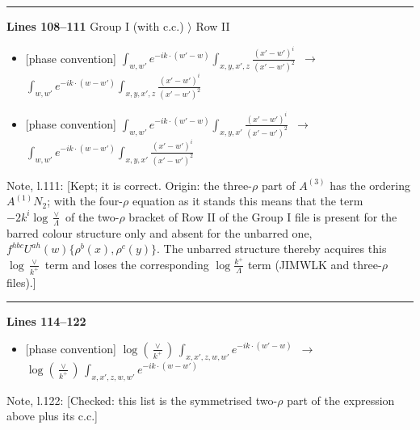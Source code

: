 \documentclass[10pt]{article}
\newenvironment{notebox}{\def\FrameCommand{{\color{notebar}\vrule width 1.5pt}\hspace{6pt}}\MakeFramed{\advance\hsize-\width\FrameRestore}\small}{\endMakeFramed}
\begin{document}
\noindent\rule{\linewidth}{0.3pt}\par\noindent\textbf{Lines 108--111} \quad \textsf{Group I (with c.c.) $\rangle$ Row II} \par
\begin{itemize}[leftmargin=2.2em,itemsep=1pt,topsep=2pt]
\item[\textbf{l.108}] \textsf{\small [phase convention]} $\displaystyle \int_{w,w'} e^{-ik\cdot(w'-w)}\int_{x,y,x',z}\frac{(x'-w')^{i}}{(x'-w')^{2}}$\ $\longrightarrow$\ $\displaystyle \int_{w,w'} e^{-ik\cdot(w-w')}\int_{x,y,x',z}\frac{(x'-w')^{i}}{(x'-w')^{2}}$
\item[\textbf{l.110}] \textsf{\small [phase convention]} $\displaystyle \int_{w,w'} e^{-ik\cdot(w'-w)}\int_{x,y,x'}\frac{(x'-w')^{i}}{(x'-w')^{2}}$\ $\longrightarrow$\ $\displaystyle \int_{w,w'} e^{-ik\cdot(w-w')}\int_{x,y,x'}\frac{(x'-w')^{i}}{(x'-w')^{2}}$
\end{itemize}
\begin{notebox}\textsf{\small Note, l.111:} [Kept; it is correct. Origin: the three-$\rho$ part of $A^{(3)}$ has the ordering $A^{(1)}N_{2}$; with the four-$\rho$ equation as it stands this means that the term $-2k^{i}\log\frac{\vee}{\Lambda}$ of the two-$\rho$ bracket of Row II of the Group I file is present for the barred colour structure only and absent for the unbarred one, $f^{hbc}U^{ah}(w)\{\rho^{b}(x),\rho^{c}(y)\}$. The unbarred structure thereby acquires this $\log\frac{\vee}{k^{+}}$ term and loses the corresponding $\log\frac{k^{+}}{\Lambda}$ term (JIMWLK and three-$\rho$ files).]\end{notebox}
\noindent\rule{\linewidth}{0.3pt}\par\noindent\textbf{Lines 114--122} \par
\begin{itemize}[leftmargin=2.2em,itemsep=1pt,topsep=2pt]
\item[\textbf{l.114}] \textsf{\small [phase convention]} $\displaystyle \log{(\frac{\vee}{k^{+}})}\, \int_{x,x',z,w,w'}e^{-ik\cdot(w'-w)}$\ $\longrightarrow$\ $\displaystyle \log{(\frac{\vee}{k^{+}})}\, \int_{x,x',z,w,w'}e^{-ik\cdot(w-w')}$
\end{itemize}
\begin{notebox}\textsf{\small Note, l.122:} [Checked: this list is the symmetrised two-$\rho$ part of the expression above plus its c.c.]\end{notebox}
\end{document}
